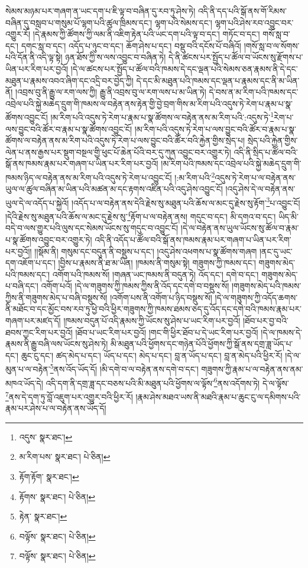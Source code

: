 སེམས་མཉམ་པར་གཞག་ན་ཡང་དག་པ་ཇི་ལྟ་བ་བཞིན་དུ་རབ་ཏུ་ཤེས་ཏེ། འདི་ནི་དད་པའི་སྒོ་ནས་གོ་རིམས་བཞིན་དུ་བསླབ་པ་གསུམ་པོ་ལྷག་པའི་ཚུལ་ཁྲིམས་དང་། ལྷག་པའི་སེམས་དང་། ལྷག་པའི་ཤེས་རབ་འབྱུང་བར་འགྱུར་རོ། །དེ་རྣམས་ཀྱི་ཚོགས་ཀྱི་ལམ་ནི་འཇིག་རྟེན་པའི་ཡང་དག་པའི་ལྟ་བ་དང་། གཏོང་བ་དང་། གསོ་སླ་བ་དང་། དགང་སླ་བ་དང་། འདོད་པ་ཉུང་བ་དང་། ཆོག་ཤེས་པ་དང་། བསྡུ་བའི་དངོས་པོ་བཞིའོ། །གསོ་སླ་བ་ལ་སོགས་པའི་དོན་ནི་འདི་ལྟ་སྟེ། ཉན་ཐོས་ཀྱི་ས་ལས་འབྱུང་བ་བཞིན་ཏེ། དེ་ནི་ཚངས་པར་སྤྱོད་པ་ཚོལ་བ་ཡོངས་སུ་རྫོགས་པ་ཡིན་པར་རིག་པར་བྱའོ། །དེ་ལ་ཚངས་པར་སྤྱོད་པ་ཚོལ་བའི་ཁམས་དེ་དང་ལྡན་པའི་སེམས་ཅན་རྣམས་ནི་དེ་དང་མཐུན་པ་རྣམས་འབའ་ཞིག་དང་འདྲི་བར་བྱེད་ཀྱི། དེ་དང་མི་མཐུན་པའི་ཁམས་དང་ལྡན་པ་རྣམས་དང་ནི་མ་ཡིན་ནོ། །འབྲས་བུ་ནི་རྒྱུ་ལ་རག་ལས་ཀྱི། རྒྱུ་ནི་འབྲས་བུ་ལ་རག་ལས་པ་མ་ཡིན་ཏེ། དེ་བས་ན་མ་རིག་པའི་ཁམས་དང་འབྲེལ་པའི་སྐྱེ་མཆེད་དྲུག་གི་ཁམས་ལ་བརྟེན་ནས་རྟེན་གྱི་བྱེ་བྲག་གིས་མ་རིག་པའི་འདུས་ཏེ་རེག་པ་རྣམ་པ་སྣ་ཚོགས་འབྱུང་ངོ། །མ་རིག་པའི་འདུས་ཏེ་རེག་པ་རྣམ་པ་སྣ་ཚོགས་ལ་བརྟེན་ནས་མ་རིག་པའི་:འདུས་ཏེ་\footnote{འདུས་  སྣར་ཐང་། }རེག་པ་ལས་བྱུང་བའི་ཚོར་བ་རྣམ་པ་སྣ་ཚོགས་འབྱུང་ངོ། །མ་རིག་པའི་འདུས་ཏེ་རེག་པ་ལས་བྱུང་བའི་ཚོར་བ་རྣམ་པ་སྣ་ཚོགས་ལ་བརྟེན་ནས་མ་རིག་པའི་འདུས་ཏེ་རེག་པ་ལས་བྱུང་བའི་ཚོར་བའི་རྐྱེན་གྱིས་སྲེད་པ། སྲེད་པའི་རྐྱེན་གྱིས་ལེན་པ་ནས་རྒྱས་པར་སྡུག་བསྔལ་གྱི་ཕུང་པོ་ཆེན་པོའི་བར་དུ་ཀུན་འབྱུང་བར་འགྱུར་ཏེ། འདི་ནི་སྲིད་པ་ཚོལ་བའི་སྒོ་ནས་ཁམས་རྣམ་པར་གཞག་པ་ཡིན་པར་རིག་པར་བྱའོ། །མ་རིག་པའི་ཁམས་དང་འབྲེལ་པའི་སྐྱེ་མཆེད་དྲུག་གི་ཁམས་ཉིད་ལ་བརྟེན་ནས་མ་རིག་པའི་འདུས་ཏེ་རེག་པ་འབྱུང་ངོ། །:མ་རིག་པའི་\footnote{མ་རིག་པས་  སྣར་ཐང་།  པེ་ཅིན། }འདུས་ཏེ་རེག་པ་ལ་བརྟེན་ནས་ཡུལ་ལ་ཚུལ་བཞིན་མ་ཡིན་པའི་མཚན་མ་དང་རྟགས་འཛིན་པའི་འདུ་ཤེས་འབྱུང་ངོ། །འདུ་ཤེས་དེ་ལ་བརྟེན་ནས་ཡུལ་དེ་ལ་འདོད་པ་སྐྱེའོ། །འདོད་པ་ལ་བརྟེན་ནས་དེའི་རྗེས་སུ་མཐུན་པའི་ཆོས་ལ་མང་དུ་རྗེས་སུ་རྟོག་\footnote{རྟོག་རྟོག་  སྣར་ཐང་། }པ་འབྱུང་ངོ། །དེའི་རྗེས་སུ་མཐུན་པའི་ཆོས་ལ་མང་དུ་རྗེས་སུ་\footnote{རྟོགས་  སྣར་ཐང་།  པེ་ཅིན། }རྟོག་པ་ལ་བརྟེན་ནས། གདུང་བ་དང་། མི་དགའ་བ་དང་། ཡིད་མི་བདེ་བ་ལས་གྱུར་པའི་ལུས་དང་སེམས་ཡོངས་སུ་གདུང་བ་འབྱུང་ངོ། །དེ་ལ་བརྟེན་ནས་ཡུལ་ཡོངས་སུ་ཚོལ་བ་རྣམ་པ་སྣ་ཚོགས་འབྱུང་བར་འགྱུར་ཏེ། འདི་ནི་འདོད་པ་ཚོལ་བའི་སྒོ་ནས་ཁམས་རྣམ་པར་གཞག་པ་ཡིན་པར་རིག་པར་བྱའོ།། །།སྡོམ་ནི། གསུམ་དང་བདུན་ནི་བསྡུས་པ་དང་། །འདུ་ཤེས་འཕགས་པ་སྣ་ཚོགས་གཞག །ནང་དུ་ཡང་དག་འཇོག་པ་དང་། །བྱིས་པ་རྣམས་ནི་ཐ་མ་ཡིན། །ཁམས་ནི་གསུམ་སྟེ། གཟུགས་ཀྱི་ཁམས་དང་། གཟུགས་མེད་པའི་ཁམས་དང་། འགོག་པའི་ཁམས་སོ། །གཞན་ཡང་ཁམས་ནི་བདུན་ཏེ། འོད་དང་། དགེ་བ་དང་། གཟུགས་མེད་པ་བཞི་དང་། འགོག་པའོ། །དེ་ལ་གཟུགས་ཀྱི་ཁམས་ཀྱིས་ནི་འོད་དང་དགེ་བ་བསྡུས་སོ། །གཟུགས་མེད་པའི་ཁམས་ཀྱིས་ནི་གཟུགས་མེད་པ་བཞི་བསྡུས་སོ། །འགོག་པས་ནི་འགོག་པ་ཉིད་བསྡུས་སོ། །དེ་ལ་གཟུགས་ཀྱི་འདོད་ཆགས་ནི་མཐོང་བ་དང་མྱོང་བས་རབ་ཏུ་ཕྱེ་བའི་ཕྱིར་གཟུགས་ཀྱི་ཁམས་ཐམས་ཅད་དུ་འོད་དང་དགེ་བའི་ཁམས་རྣམ་པར་གཞག་པར་མཛད་དོ། །ཁམས་བདུན་པོ་འདི་རྣམས་ཀྱི་ཡོངས་སུ་ཤེས་པ་ཡང་རིག་པར་བྱའོ། །ཐོབ་པར་བྱ་བའི་ཐབས་ཀྱང་རིག་པར་བྱའོ། །ཐོབ་པ་ཡང་རིག་པར་བྱའོ། །གང་གི་ཕྱིར་ཐོབ་པ་དེ་ཡང་རིག་པར་བྱའོ། །དེ་ལ་ཁམས་དེ་རྣམས་ནི་རྒྱུ་བཞི་ལས་ཡོངས་སུ་ཤེས་ཏེ། མི་མཐུན་པའི་ཕྱོགས་དང་གཉེན་པོའི་ཕྱོགས་ཀྱི་སྒོ་ནས་དགྲ་ཟླ་ཡོད་པ་དང་། ཆུང་ངུ་དང་། ཚད་མེད་པ་དང་། ཡོད་པ་དང་། མེད་པ་དང་། བླ་ན་ཡོད་པ་དང་། བླ་ན་མེད་པའི་ཕྱིར་རོ། །དེ་ལ་མུན་པ་ལ་བརྟེན་\footnote{རྟེན་  སྣར་ཐང་། }ནས་འོད་ཡོད་དོ། །མི་དགེ་བ་ལ་བརྟེན་ནས་དགེ་བ་དང་། གཟུགས་ཀྱི་རྣམ་པ་ལ་བརྟེན་ནས་ནམ་མཁའ་ཡོད་དེ། འདི་དག་ནི་དགྲ་ཟླ་དང་བཅས་པའི་མི་མཐུན་པའི་ཕྱོགས་ལ་ལྟོས་\footnote{བལྟོས་  སྣར་ཐང་།  པེ་ཅིན། }ནས་འདོགས་ཏེ། དེ་ལ་ལྟོས་\footnote{བལྟོས་  སྣར་ཐང་།  པེ་ཅིན། }ནས་དེ་དག་ཏུ་བློ་འཇུག་པར་འགྱུར་བའི་ཕྱིར་རོ། །རྣམ་ཤེས་མཐའ་ཡས་ནི་མཐའི་རྣམ་པ་ཆུང་ངུ་ལ་དམིགས་པའི་རྣམ་པར་ཤེས་པ་ལ་བརྟེན་ནས་ཡོད་དོ། 